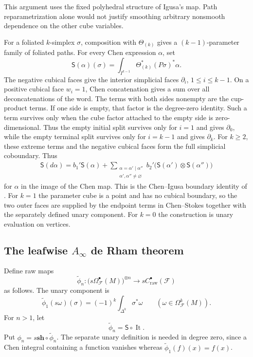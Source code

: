 \documentclass[12pt]{amsart}
\theoremstyle{definition}
\theoremstyle{remark}
\numberwithin{equation}{section}
\newcommand{\CF}{{\mathcal F}}
\newcommand{\1}{{\mathbb{1}}}
\begin{document}
This argument uses the fixed polyhedral structure of Igusa's map.
Path reparametrization alone would not justify smoothing arbitrary
nonsmooth dependence on the other cube variables.

For a foliated $k$-simplex $\sigma$, composition with $\Theta_{(k)}$
gives a $(k-1)$-parameter family of foliated paths.  For every Chen
expression $\alpha$, set
\[
 \mathsf S(\alpha)(\sigma)
 =
 \int_{I^{k-1}}
 \Theta_{(k)}^*(P\sigma)^*\alpha.
\]
The negative cubical faces give the interior simplicial faces
$\partial_i$, $1\leq i\leq k-1$.  On a positive cubical face
$w_i=1$, Chen concatenation gives a sum over all deconcatenations of
the word.  The terms with both sides nonempty are the cup-product
terms.  If one side is empty, that factor is the degree-zero identity.
Such a term survives only when the cube factor attached to the empty
side is zero-dimensional.  Thus the empty initial split survives only
for $i=1$ and gives $\partial_0$, while the empty terminal split
survives only for $i=k-1$ and gives $\partial_k$.  For $k\geq2$, these
extreme terms and the negative cubical faces form the full simplicial
coboundary.  Thus
\begin{align}
 \mathsf S(d\alpha)
 =
 b_1'\mathsf S(\alpha)
 +
 \sum_{\substack{\alpha=\alpha'\mid\alpha''\\
                  \alpha',\alpha''\neq\varnothing}}
 b_2'\bigl(\mathsf S(\alpha')\otimes
 \mathsf S(\alpha'')\bigr)
 \label{eq:igusa-stokes}
\end{align}
for $\alpha$ in the image of the Chen map.  This is the
Chen--Igusa boundary identity of \cite[Proposition 3.22]{AS12}.
For $k=1$ the parameter cube is a point and has no cubical boundary,
so the two outer faces are supplied by the endpoint terms in
Chen--Stokes together with the separately defined unary component.
For $k=0$ the construction is unary evaluation on vertices.

\subsection{The leafwise $A_{\infty}$ de Rham theorem}

Define raw maps
\[
 \widetilde\phi_n:
 \bigl(s\Omega^\bullet_{\CF}(M)\bigr)^{\otimes n}
 \longrightarrow
 sC^\bullet_{\mathrm{raw}}(\CF)
\]
as follows.  The unary component is
\[
 \widetilde\phi_1(s\omega)(\sigma)
 =(-1)^k\int_{\Delta^k}\sigma^*\omega
 \qquad(\omega\in\Omega^k_{\CF}(M)).
\]
For $n>1$, let
\[
 \widetilde\phi_n=\mathsf S\circ\operatorname{It}.
\]
Put $\phi_n=s\mathbf{sh}\circ\widetilde\phi_n$.
The separate unary definition is needed in degree zero, since a Chen
integral containing a function vanishes whereas
$\widetilde\phi_1(f)(x)=f(x)$.
\end{document}
